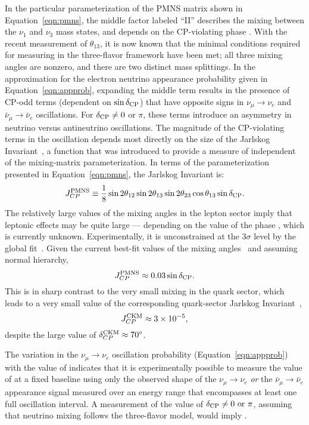 In the particular parameterization of the PMNS matrix shown in
Equation~\ref{eqn:pmns}, the middle factor labeled ``II'' describes
the mixing between the $\nu_1$ and $\nu_3$ mass states, and depends on
the CP-violating phase \deltacp.  With the recent measurement of
$\theta_{13}$, it is now known that the minimal conditions required
for measuring \deltacp in the three-flavor framework have been met;
all three mixing angles are nonzero, and there are two distinct mass
splittings.  In the approximation for the electron neutrino appearance
probability given in Equation~\ref{eqn:appprob}, expanding the middle
term results in the presence of CP-odd terms (dependent on $\sin
\delta_{\rm CP}$) that have opposite signs in $\nu_{\mu} \rightarrow \nu_e$
and $\bar{\nu}_{\mu} \rightarrow \bar{\nu}_e$ oscillations.
For $\delta_{\rm CP} \neq 0$ or $\pi$, these terms introduce an asymmetry in
neutrino versus antineutrino oscillations. The magnitude of the
CP-violating terms in the oscillation depends most directly on the
size of the Jarlskog Invariant~\cite{Jarlskog:1985cw}, a function that
was introduced to provide a measure of  independent of the
mixing-matrix parameterization. In terms of the parameterization
presented in Equation~\ref{eqn:pmns}, the Jarlskog Invariant is:
%
\begin{equation}
J_{CP}^{\rm PMNS} \equiv \frac{1}{8} \sin 2 \theta_{12} \sin 2 \theta_{13}
\sin 2 \theta_{23} \cos \theta_{13} \sin \delta_{\rm CP}.
\end{equation}
The relatively large values of the mixing angles in the lepton sector imply that
leptonic  effects may be quite large ---  
depending on the value of the phase \deltacp, which is currently unknown. 
Experimentally, it is unconstrained at the 3$\sigma$ level by the global fit~\cite{Gonzalez-Garcia:2014bfa}.
Given the current best-fit values of the mixing angles~\cite{Gonzalez-Garcia:2014bfa} and assuming normal hierarchy,
\begin{equation}
J_{CP}^{\rm PMNS} \approx 0.03 \sin \delta_{\rm CP}.
\end{equation}
This is in sharp contrast to the very small mixing in the quark sector,  
which leads to a very small value of the corresponding quark-sector
Jarlskog Invariant~\cite{Tanabashi:2018oca}, %
\begin{equation}
J_{CP}^{\rm CKM} \approx 3 \times 10^{-5},
\end{equation}
despite the large value of $\delta^{\rm CKM}_{CP}\approx70^{\circ}$.

The variation in the $\nu_\mu \rightarrow
\nu_e$ oscillation probability (Equation~\ref{eqn:appprob}) with the value of \deltacp
indicates that it is experimentally possible to measure the value of
\deltacp at a fixed baseline using only the observed shape of the
$\nu_\mu \rightarrow \nu_e$ {\em or} the 
$\bar{\nu}_\mu \rightarrow \bar{\nu}_e$
appearance signal measured over an energy range that encompasses at
least one full oscillation interval. A measurement of the value of
$\delta_{\rm CP} \neq 0 \ {\rm or} \ \pi$, assuming that neutrino mixing follows the three-flavor model, would imply .  

